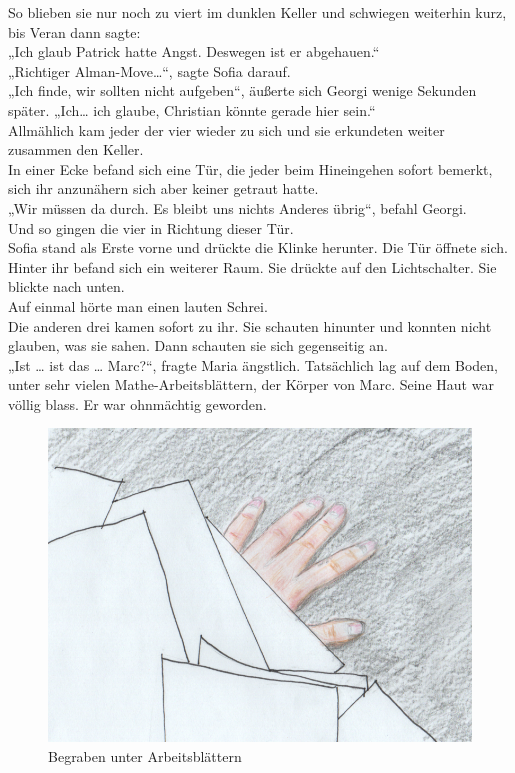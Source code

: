 \documentclass[oneside]{memoir}
\begin{document}
\bigskip
\noindent So blieben sie nur noch zu viert im dunklen Keller und schwiegen weiterhin kurz, bis Veran dann sagte: \\
„Ich glaub Patrick hatte Angst. Deswegen ist er abgehauen.“ \\
„Richtiger Alman-Move\ldots“, sagte Sofia darauf. \\
„Ich finde, wir sollten nicht aufgeben“, äußerte sich Georgi wenige Sekunden später. „Ich\ldots{} ich glaube, Christian könnte gerade hier sein.“ \\
Allmählich kam jeder der vier wieder zu sich und sie erkundeten weiter zusammen den Keller. \\
In einer Ecke befand sich eine Tür, die jeder beim Hineingehen sofort bemerkt, sich ihr anzunähern sich aber keiner getraut hatte. \\
„Wir müssen da durch. Es bleibt uns nichts Anderes übrig“, befahl Georgi. \\
Und so gingen die vier in Richtung dieser Tür. \\
Sofia stand als Erste vorne und drückte die Klinke herunter. Die Tür öffnete sich. Hinter ihr befand sich ein weiterer Raum. Sie drückte auf den Lichtschalter. Sie blickte nach unten. \\
Auf einmal hörte man einen lauten Schrei. \\
Die anderen drei kamen sofort zu ihr. Sie schauten hinunter und konnten nicht glauben, was sie sahen. Dann schauten sie sich gegenseitig an. \\
„Ist \ldots{} ist das \ldots{} Marc?“, fragte Maria ängstlich.
Tatsächlich lag auf dem Boden, unter sehr vielen Mathe-Arbeitsblättern, der Körper von Marc. Seine Haut war völlig blass. Er war ohnmächtig geworden.

\bigskip
\begin{figure}[htbp] 
  \centering
     \includegraphics[scale=1]{Bilder/marc.png}
  \caption{Begraben unter Arbeitsblättern}
\end{figure}
\end{document}
